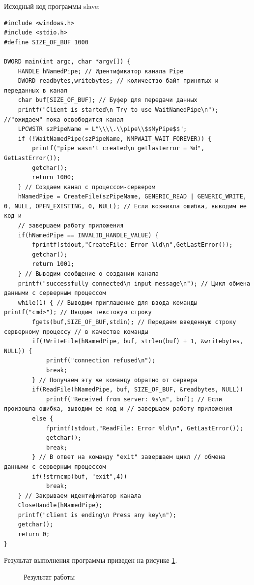 \documentclass[a4paper]{article}
\begin{document}
	
	Исходный код программы slave:
	\begin{lstlisting}[style=crs_cpp]
#include <windows.h>
#include <stdio.h> 
#define SIZE_OF_BUF 1000 

DWORD main(int argc, char *argv[]) { 
	HANDLE hNamedPipe; // Идентификатор канала Pipe 
	DWORD readbytes,writebytes; // количество байт принятых и переданных в канал
	char buf[SIZE_OF_BUF]; // Буфер для передачи данных 
	printf("Client is started\n Try to use WaitNamedPipe\n"); //"ожидаем" пока освободится канал
	LPCWSTR szPipeName = L"\\\\.\\pipe\\$$MyPipe$$";
	if (!WaitNamedPipe(szPipeName, NMPWAIT_WAIT_FOREVER)) {
		printf("pipe wasn't created\n getlasterror = %d", GetLastError()); 
		getchar();
		return 1000;
	} // Создаем канал с процессом-сервером
	hNamedPipe = CreateFile(szPipeName, GENERIC_READ | GENERIC_WRITE, 0, NULL, OPEN_EXISTING, 0, NULL); // Если возникла ошибка, выводим ее код и
	// завершаем работу приложения 
	if(hNamedPipe == INVALID_HANDLE_VALUE) {
		fprintf(stdout,"CreateFile: Error %ld\n",GetLastError()); 
		getchar(); 
		return 1001;
	} // Выводим сообщение о создании канала
	printf("successfully connected\n input message\n"); // Цикл обмена данными с серверным процессом 
	while(1) { // Выводим приглашение для ввода команды printf("cmd>"); // Вводим текстовую строку 
		fgets(buf,SIZE_OF_BUF,stdin); // Передаем введенную строку серверному процессу // в качестве команды
		if(!WriteFile(hNamedPipe, buf, strlen(buf) + 1, &writebytes, NULL)) { 
			printf("connection refused\n"); 
			break;
		} // Получаем эту же команду обратно от сервера
		if(ReadFile(hNamedPipe, buf, SIZE_OF_BUF, &readbytes, NULL)) 
			printf("Received from server: %s\n", buf); // Если произошла ошибка, выводим ее код и // завершаем работу приложения 
		else { 
			fprintf(stdout,"ReadFile: Error %ld\n", GetLastError()); 
			getchar(); 
			break;
		} // В ответ на команду "exit" завершаем цикл // обмена данными с серверным процессом
		if(!strncmp(buf, "exit",4))
			break;
	} // Закрываем идентификатор канала 
	CloseHandle(hNamedPipe); 
	printf("client is ending\n Press any key\n");
	getchar(); 
	return 0;
}
	\end{lstlisting}
	
	Результат выполнения программы приведен на рисунке \ref{img:task4}.
	\begin{figure}[h!]
		\caption{Результат работы}
		\label{img:task4}
	\end{figure}
	
\end{document}
